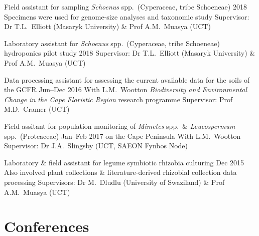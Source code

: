 \documentclass[10pt]{article}
\begin{document}
\begin{hangparas}{2em}{1}

Field assistant for sampling \textit{Schoenus} spp.~(Cyperaceae, tribe 
Schoeneae)                                                    \hfill 2018 \break
Specimens were used for genome-size analyses and taxonomic study          \break
Supervisor: Dr T.L.~Elliott (Masaryk University) \& Prof A.M.~Muasya (UCT)

Laboratory assistant for \textit{Schoenus} spp.~(Cyperaceae, tribe Schoeneae) 
hydroponics pilot study                                       \hfill 2018 \break
Supervisor: Dr T.L.~Elliott (Masaryk University) \& Prof A.M.~Muasya (UCT)

Data processing assistant for assessing the current available data for the 
soils of the GCFR                                    \hfill Jun--Dec 2016 \break
With L.M.~Wootton                                                         \break
\textit{Biodiversity and Environmental Change in the Cape Floristic Region} 
research programme                                                        \break
Supervisor: Prof M.D.~Cramer (UCT)

Field assitant for population monitoring of
  \textit{Mimetes} spp.~\&
  \textit{Leucospermum} spp.~(Proteaceae)            \hfill Jan--Feb 2017 \break
  on the Cape Peninsula                                                   \break
With L.M.~Wootton                                                         \break
Supervisor: Dr J.A.~Slingsby (UCT, SAEON Fynbos Node)

Laboratory \& field assistant for legume symbiotic rhizobia culturing
                                                          \hfill Dec 2015 \break
Also involved plant collections \& literature-derived rhizobial collection 
data processing                                                           \break
Supervisors: Dr M.~Dludlu (University of Swaziland) \& Prof A.M.~Muasya (UCT)


\hfill

\end{hangparas}

\clearpage %

\section*{Conferences} %
\end{document}
